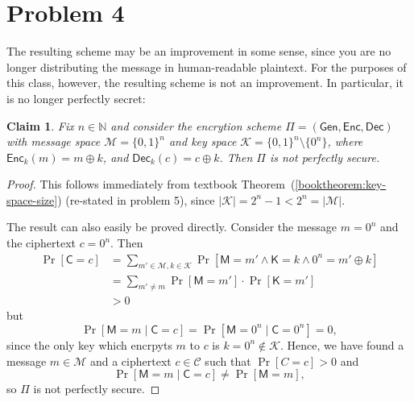 \documentclass[12pt]{article}
\numberwithin{equation}{section}
\theoremstyle{plain}
\newtheorem{claim}{Claim}
\newcommand{\set}[1]{\{ #1 \}}
\DeclareMathOperator*{\prob}{Pr}
\newcommand{\given}{\mid}
\newcommand{\ctexts}{\mathcal{C}}
\newcommand{\ctext}{\algo{C}}
\newcommand{\ptexts}{\mathcal{M}}
\newcommand{\ptext}{\algo{M}}
\newcommand{\keys}{\mathcal{K}}
\newcommand{\key}{\algo{K}}
\newcommand{\algo}[1]{\mathsf{#1}}
\newcommand{\gen}{\algo{Gen}}
\newcommand{\enc}{\algo{Enc}}
\newcommand{\dec}{\algo{Dec}}
\begin{document}
\section*{Problem 4}

The resulting scheme may be an improvement in some sense,
since you are no longer distributing the message in human-readable plaintext.
For the purposes of this class, however,
the resulting scheme is not an improvement.
In particular, it is no longer perfectly secret:
\begin{claim}
Fix $n \in \mathbb{N}$ and consider the encrytion scheme $\Pi = (\gen, \enc, \dec)$
with message space $\ptexts = \set{ 0, 1 }^n$ and key space $\keys = \set{0, 1}^n \setminus \set{0^n}$,
where $\enc_k(m) = m \oplus k$,
and $\dec_k(c) = c \oplus k$.
Then $\Pi$ is not perfectly secure.
\end{claim}
\begin{proof}
This follows immediately from textbook Theorem~(\ref{booktheorem:key-space-size}) (re-stated in problem 5),
since $|\keys| = 2^n - 1 < 2^n = |\ptexts|$.

The result can also easily be proved directly.
Consider the message $m = 0^n$ and the ciphertext $c = 0^n$.
Then
\begin{align*}
    \prob[\ctext = c]
        &= \sum_{m' \in \ptexts, k \in \keys}{ \prob[\ptext = m' \wedge \key = k \wedge 0^n = m' \oplus k] }\\
        &= \sum_{m' \neq m}{ \prob[\ptext = m'] \cdot \prob[\key = m'] }\\
        &> 0
\end{align*}
but
\begin{equation*}
    \prob[\ptext = m \given \ctext = c] = \prob[\ptext = 0^n \given \ctext = 0^n] = 0,
\end{equation*}
since the only key which encrpyts $m$ to $c$ is $k = 0^n \not\in \keys$.
Hence, we have found a message $m \in \ptexts$
and a ciphertext $c \in \ctexts$
such that $\prob[C = c] > 0$
and
\begin{equation*}
    \prob[\ptext = m \given \ctext = c] \neq \prob[\ptext = m],
\end{equation*}
so $\Pi$ is not perfectly secure.
\end{proof}
\end{document}
